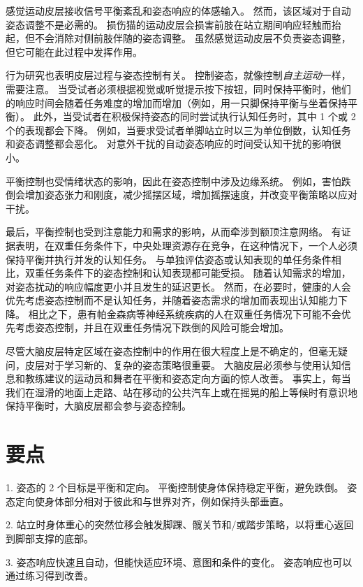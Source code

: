 感觉运动皮层接收信号平衡紊乱和姿态响应的体感输入。
然而，该区域对于自动姿态调整不是必需的。
损伤猫的运动皮层会损害前肢在站立期间响应轻触而抬起，但不会消除对侧前肢伴随的姿态调整。
虽然感觉运动皮层不负责姿态调整，但它可能在此过程中发挥作用。


行为研究也表明皮层过程与姿态控制有关。
控制姿态，就像控制\textit{自主运动}一样，需要注意。
当受试者必须根据视觉或听觉提示按下按钮，同时保持平衡时，他们的响应时间会随着任务难度的增加而增加（例如，用一只脚保持平衡与坐着保持平衡）。
此外，当受试者在积极保持姿态的同时尝试执行认知任务时，其中 1 个或 2 个的表现都会下降。
例如，当要求受试者单脚站立时以三为单位倒数，认知任务和姿态调整都会恶化。
对意外干扰的自动姿态响应的时间受认知干扰的影响很小。


平衡控制也受情绪状态的影响，因此在姿态控制中涉及边缘系统。
例如，害怕跌倒会增加姿态张力和刚度，减少摇摆区域，增加摇摆速度，并改变平衡策略以应对干扰。


最后，平衡控制也受到注意能力和需求的影响，从而牵涉到额顶注意网络。
有证据表明，在双重任务条件下，中央处理资源存在竞争，在这种情况下，一个人必须保持平衡并执行并发的认知任务。
与单独评估姿态或认知表现的单任务条件相比，双重任务条件下的姿态控制和认知表现都可能受损。
随着认知需求的增加，对姿态扰动的响应幅度更小并且发生的延迟更长。
然而，在必要时，健康的人会优先考虑姿态控制而不是认知任务，并随着姿态需求的增加而表现出认知能力下降。
相比之下，患有帕金森病等神经系统疾病的人在双重任务情况下可能不会优先考虑姿态控制，并且在双重任务情况下跌倒的风险可能会增加。


尽管大脑皮层特定区域在姿态控制中的作用在很大程度上是不确定的，但毫无疑问，皮层对于学习新的、复杂的姿态策略很重要。
大脑皮层必须参与使用认知信息和教练建议的运动员和舞者在平衡和姿态定向方面的惊人改善。
事实上，每当我们在湿滑的地面上走路、站在移动的公共汽车上或在摇晃的船上等候时有意识地保持平衡时，大脑皮层都会参与姿态控制。



\section{要点}

1. 姿态的 2 个目标是平衡和定向。
平衡控制使身体保持稳定平衡，避免跌倒。
姿态定向使身体部分相对于彼此和与世界对齐，例如保持头部垂直。


2. 站立时身体重心的突然位移会触发脚踝、髋关节和/或踏步策略，以将重心返回到脚部支撑的底部。


3. 姿态响应快速且自动，但能快适应环境、意图和条件的变化。
姿态响应也可以通过练习得到改善。


